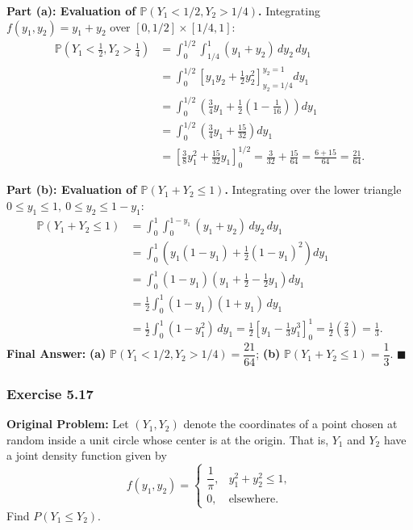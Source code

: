 \documentclass[11pt, letterpaper]{article}
\theoremstyle{definition}
\theoremstyle{remark}
\begin{document}
\textbf{Part (a): Evaluation of $\mathbb{P}(Y_1 < 1/2, Y_2 > 1/4)$.}
Integrating $f(y_1, y_2) = y_1 + y_2$ over $[0, 1/2] \times [1/4, 1]$:
\begin{align*}
    \mathbb{P}\!\left(Y_1 < \frac{1}{2}, Y_2 > \frac{1}{4}\right) 
    &= \int_{0}^{1/2} \int_{1/4}^{1} (y_1 + y_2) \, dy_2 \, dy_1 \\
    &= \int_{0}^{1/2} \left[ y_1 y_2 + \frac{1}{2} y_2^2 \right]_{y_2 = 1/4}^{y_2 = 1} dy_1 \\
    &= \int_{0}^{1/2} \left( \frac{3}{4} y_1 + \frac{1}{2}\left(1 - \frac{1}{16}\right) \right) dy_1 \\
    &= \int_{0}^{1/2} \left( \frac{3}{4} y_1 + \frac{15}{32} \right) dy_1 \\
    &= \left[ \frac{3}{8} y_1^2 + \frac{15}{32} y_1 \right]_{0}^{1/2} = \frac{3}{32} + \frac{15}{64} = \frac{6 + 15}{64} = \frac{21}{64}.
\end{align*}

\textbf{Part (b): Evaluation of $\mathbb{P}(Y_1 + Y_2 \le 1)$.}
Integrating over the lower triangle $0 \le y_1 \le 1,\ 0 \le y_2 \le 1 - y_1$:
\begin{align*}
    \mathbb{P}(Y_1 + Y_2 \le 1) &= \int_{0}^{1} \int_{0}^{1 - y_1} (y_1 + y_2) \, dy_2 \, dy_1 \\
    &= \int_{0}^{1} \left( y_1(1 - y_1) + \frac{1}{2}(1 - y_1)^2 \right) dy_1 \\
    &= \int_{0}^{1} (1 - y_1) \left( y_1 + \frac{1}{2} - \frac{1}{2} y_1 \right) dy_1 \\
    &= \frac{1}{2} \int_{0}^{1} (1 - y_1)(1 + y_1) \, dy_1 \\
    &= \frac{1}{2} \int_{0}^{1} (1 - y_1^2) \, dy_1 = \frac{1}{2} \left[ y_1 - \frac{1}{3} y_1^3 \right]_{0}^{1} = \frac{1}{2}\left(\frac{2}{3}\right) = \frac{1}{3}.
\end{align*}
\textbf{Final Answer:} \textbf{(a)} $\mathbb{P}(Y_1 < 1/2, Y_2 > 1/4) = \dfrac{21}{64}$; \quad \textbf{(b)} $\mathbb{P}(Y_1 + Y_2 \le 1) = \dfrac{1}{3}$. $\blacksquare$

\bigskip

\subsubsection*{Exercise 5.17}
\textbf{Original Problem:} Let $(Y_1, Y_2)$ denote the coordinates of a point chosen at random inside a unit circle whose center is at the origin. That is, $Y_1$ and $Y_2$ have a joint density function given by
\[
    f(y_1, y_2) = \begin{cases}
        \dfrac{1}{\pi}, & y_1^2 + y_2^2 \le 1, \\[6pt]
        0, & \text{elsewhere.}
    \end{cases}
\]
Find $P(Y_1 \le Y_2)$.
\end{document}
